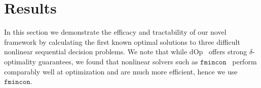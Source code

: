 \section{Results}
\label{sec:results}

In this section we demonstrate the efficacy and tractability of our novel framework by calculating the first known optimal solutions to three difficult nonlinear sequential decision problems.
We note that while dOp~\cite{Gao2013} offers strong {\footnotesize $ \delta $}-optimality guarantees, we found that nonlinear solvers such as $ \mathtt{fmincon} $~\cite{MATLAB_2010} perform comparably well at optimization and are much more efficient, hence we use $ \mathtt{fmincon} $.

